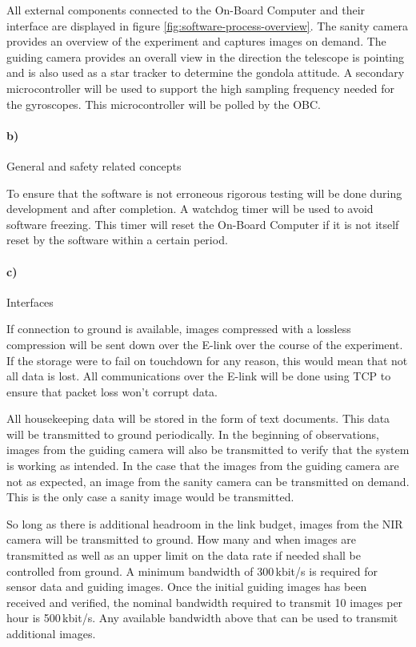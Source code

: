 All external components connected to the On-Board Computer and their interface are displayed in figure \ref{fig:software-process-overview}. The sanity camera provides an overview of the experiment and captures images on demand. The guiding camera provides an overall view in the direction the telescope is pointing and is also used as a star tracker to determine the gondola attitude. A secondary microcontroller will be used to support the high sampling frequency needed for the gyroscopes. This microcontroller will be polled by the OBC.

\paragraph{b)} General and safety related concepts

To ensure that the software is not erroneous rigorous testing will be done during development and after completion. A watchdog timer will be used to avoid software freezing. This timer will reset the On-Board Computer if it is not itself reset by the software within a certain period.

\paragraph{c)} Interfaces

If connection to ground is available, images compressed with a lossless compression will be sent down over the E-link over the course of the experiment. If the storage were to fail on touchdown for any reason, this would mean that not all data is lost. All communications over the E-link will be done using TCP to ensure that packet loss won't corrupt data.



All housekeeping data will be stored in the form of text documents. This data will be transmitted to ground periodically. In the beginning of observations, images from the guiding camera will also be transmitted to verify that the system is working as intended. In the case that the images from the guiding camera are not as expected, an image from the sanity camera can be transmitted on demand. This is the only case a sanity image would be transmitted.

So long as there is additional headroom in the link budget, images from the NIR camera will be transmitted to ground. How many and when images are transmitted as well as an upper limit on the data rate if needed shall be controlled from ground. A minimum bandwidth of 300\,kbit/s is required for sensor data and guiding images. Once the initial guiding images has been received and verified, the nominal bandwidth required to transmit 10 images per hour is 500\,kbit/s. Any available bandwidth above that can be used to transmit additional images.

